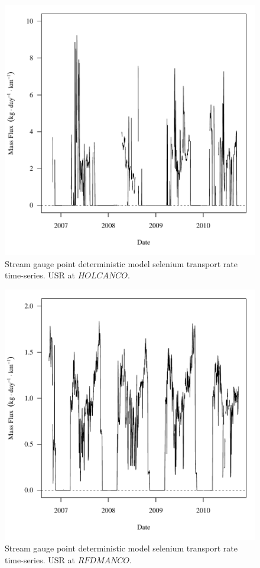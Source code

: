 \begin{figure}[htbp]
	\begin{center}
	\includegraphics[width=6in]{"Figures/Results_DUSR/f HOL"}
	\caption{Stream gauge point deterministic model selenium transport rate time-series.  USR at $HOLCANCO$.}
	\end{center}
\end{figure}
\newpage

\begin{figure}[htbp]
	\begin{center}
	\includegraphics[width=6in]{"Figures/Results_DUSR/f RFD"}
	\caption{Stream gauge point deterministic model selenium transport rate time-series.  USR at $RFDMANCO$.}
	\end{center}
\end{figure}
\newpage

